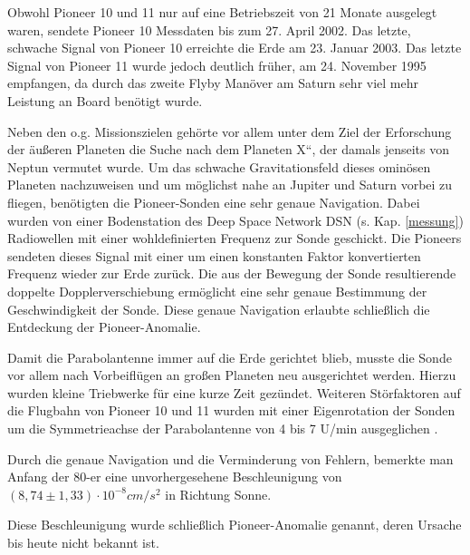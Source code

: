 \bigskip

Obwohl Pioneer 10 und 11 nur auf eine Betriebszeit von 21 Monate
ausgelegt waren, sendete Pioneer 10 Messdaten bis zum 27. April 2002.
Das letzte, schwache Signal von Pioneer 10 erreichte die Erde am 23. Januar 2003.
Das letzte Signal von Pioneer 11 wurde jedoch deutlich fr\"uher, am 24.
November 1995 empfangen, da durch das zweite Flyby Man\"over am Saturn
sehr viel mehr Leistung an Board ben\"otigt wurde.

Neben den o.g. Missionszielen geh\"orte vor allem unter dem Ziel der
Erforschung der \"au{\ss}eren Planeten die Suche nach dem
{\quotedblbase}Planeten X``, der damals jenseits von Neptun vermutet
wurde. Um das schwache Gravitationsfeld dieses omin\"osen Planeten
nachzuweisen und um m\"oglichst nahe an Jupiter und Saturn vorbei zu
fliegen, ben\"otigten die Pioneer-Sonden eine sehr genaue Navigation.
Dabei wurden von einer Bodenstation des Deep Space Network DSN (s. Kap. \ref{messung}) Radiowellen mit
einer wohldefinierten Frequenz zur Sonde geschickt. Die Pioneers
sendeten dieses Signal mit einer um einen konstanten Faktor konvertierten
Frequenz wieder zur Erde zur\"uck\cite{Dittus2006}. Die aus der Bewegung der Sonde resultierende doppelte Dopplerverschiebung ermöglicht eine sehr genaue Bestimmung der Geschwindigkeit der Sonde. Diese genaue Navigation erlaubte schlie{\ss}lich die Entdeckung der
Pioneer-Anomalie.

Damit die Parabolantenne immer auf die Erde gerichtet blieb, musste
die Sonde vor allem nach Vorbeifl\"ugen an gro{\ss}en Planeten neu
ausgerichtet werden. Hierzu wurden kleine Triebwerke f\"ur eine kurze
Zeit gez\"undet. Weiteren St\"orfaktoren auf die Flugbahn von
Pioneer 10 und 11 wurden mit einer Eigenrotation der Sonden um die
Symmetrieachse der Parabolantenne von 4 bis 7 U/min
ausgeglichen\cite{Nieto2007}\cite{Dittus2006} .

Durch die genaue Navigation und die Verminderung von Fehlern,
bemerkte man Anfang der 80-er eine unvorhergesehene Beschleunigung von
$(8,74\pm 1,33)\cdot10^{-8}\mathit{cm}/s^{2}$ \cite{Anderson2002} in Richtung Sonne.

Diese Beschleunigung wurde schlie{\ss}lich Pioneer-Anomalie genannt, deren
Ursache bis heute nicht bekannt ist. 